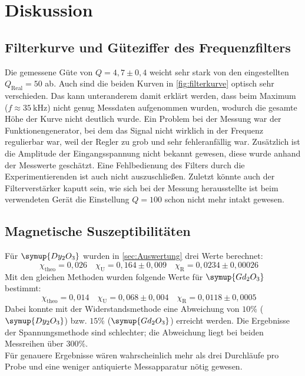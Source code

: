 \section{Diskussion}
\label{sec:Diskussion}

\subsection{Filterkurve und Güteziffer des Frequenzfilters}
\label{sec:Filterkurve und Güteziffer des Frequenzfilters}

Die gemessene Güte von $Q = 4,7 \pm 0,4$ weicht sehr stark von den eingestellten 
$Q_\text{Real} = 50$ ab. Auch sind die beiden Kurven in \autoref{fig:filterkurve} optisch
sehr verschieden. Das kann unteranderem damit erklärt werden, dass beim Maximum ($f
\approx \SI{35}{\kilo\hertz}$) nicht genug Messdaten aufgenommen wurden, wodurch die
gesamte Höhe der Kurve nicht deutlich wurde. Ein Problem bei der Messung war der
Funktionengenerator, bei dem das Signal nicht wirklich in der Frequenz regulierbar war,
weil der Regler zu grob und sehr fehleranfällig war. Zusätzlich ist die Amplitude der
Eingangsspannung nicht bekannt gewesen, diese wurde anhand der Messwerte geschätzt.
Eine Fehlbedienung des Filters durch die
Experimentierenden ist auch nicht auszuschließen. Zuletzt könnte auch der Filterverstärker
kaputt sein, wie sich bei der Messung herausstellte ist beim verwendeten Gerät die Einstellung 
$Q = 100$ schon nicht mehr intakt gewesen. 

\subsection{Magnetische Suszeptibilitäten}
\label{sec:Magnetische Suszeptibilitäten}

Für $\symup{Dy_2O_3}$ wurden in \autoref{sec:Auswertung} drei Werte berechnet:
\begin{equation}
	\label{eqn:ergebnisse-Dy2O3}
	\chi_\text{theo} = 0,026
	\quad
	\chi_\text{U} = 0,164 \pm 0,009
	\quad
	\chi_\text{R} = 0,0234 \pm 0,00026
	\quad
\end{equation}
Mit den gleichen Methoden wurden folgende Werte für $\symup{Gd_2O_3}$ bestimmt:
\begin{equation}
	\label{eqn:ergebnisse-Gd2O3}
	\chi_\text{theo} = 0,014
	\quad
	\chi_\text{U} = 0,068 \pm 0,004
	\quad
	\chi_\text{R} = 0,0118 \pm 0,0005
	\quad
\end{equation}
Dabei konnte mit der Widerstandsmethode eine Abweichung von $10\%$ ($\symup{Dy_2O_3}$) bzw.
$15\%$ ($\symup{Gd_2O_3}$) erreicht werden. Die Ergebnisse der Spannungsmethode sind
schlechter; die Abweichung liegt bei beiden Messreihen über $300\%$. \\
Für genauere Ergebnisse wären wahrscheinlich mehr als drei Durchläufe pro Probe und eine 
weniger antiquierte Messapparatur nötig gewesen.

